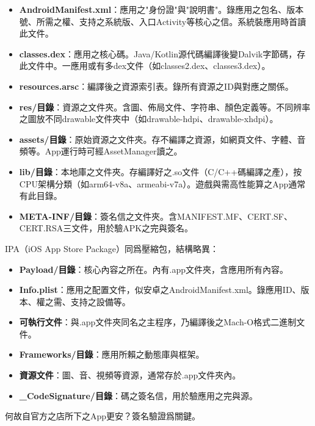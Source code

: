 \begin{itemize}
  \item \textbf{AndroidManifest.xml}：應用之"身份證"與"說明書"。錄應用之包名、版本號、所需之權、支持之系統版、入口Activity等核心之信。系統裝應用時首讀此文件。
  \item \textbf{classes.dex}：應用之核心碼。Java/Kotlin源代碼編譯後變Dalvik字節碼，存此文件中。一應用或有多dex文件（如classes2.dex、classes3.dex）。
  \item \textbf{resources.arsc}：編譯後之資源索引表。錄所有資源之ID與對應之關係。
  \item \textbf{res/目錄}：資源之文件夾。含圖、佈局文件、字符串、顏色定義等。不同辨率之圖放不同drawable文件夾中（如drawable-hdpi、drawable-xhdpi）。
  \item \textbf{assets/目錄}：原始資源之文件夾。存不編譯之資源，如網頁文件、字體、音頻等。App運行時可經AssetManager讀之。
  \item \textbf{lib/目錄}：本地庫之文件夾。存編譯好之.so文件（C/C++碼編譯之產），按CPU架構分類（如arm64-v8a、armeabi-v7a）。遊戲與需高性能算之App通常有此目錄。
  \item \textbf{META-INF/目錄}：簽名信之文件夾。含MANIFEST.MF、CERT.SF、CERT.RSA三文件，用於驗APK之完與簽名。
\end{itemize}


IPA（iOS App Store Package）同爲壓縮包，結構略異：

\begin{itemize}
  \item \textbf{Payload/目錄}：核心內容之所在。內有.app文件夾，含應用所有內容。
  \item \textbf{Info.plist}：應用之配置文件，似安卓之AndroidManifest.xml。錄應用ID、版本、權之需、支持之設備等。
  \item \textbf{可執行文件}：與.app文件夾同名之主程序，乃編譯後之Mach-O格式二進制文件。
  \item \textbf{Frameworks/目錄}：應用所賴之動態庫與框架。
  \item \textbf{資源文件}：圖、音、視頻等資源，通常存於.app文件夾內。
  \item \textbf{\_CodeSignature/目錄}：碼之簽名信，用於驗應用之完與源。
\end{itemize}


何故自官方之店所下之App更安？簽名驗證爲關鍵。

